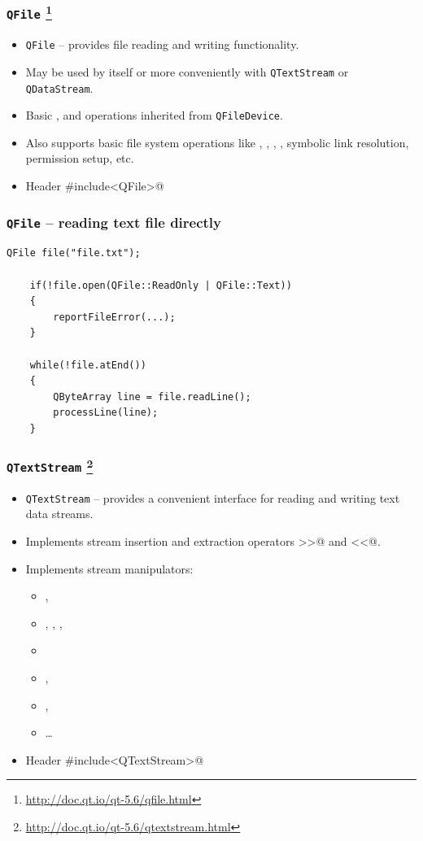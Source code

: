 \begin{frame}[fragile]
  \frametitle{\texttt{QFile}
    \footnote{\url{http://doc.qt.io/qt-5.6/qfile.html}}}
  \begin{itemize}
    \item \texttt{QFile} -- provides file reading and writing functionality.
    \item May be used by itself or more conveniently with \texttt{QTextStream}
      or \texttt{QDataStream}.
    \item Basic \verb@seek@, \verb@read@ and \verb@write@ operations inherited
      from \texttt{QFileDevice}.
    \item Also supports basic file system operations like \verb@rename@,
      \verb@remove@, \verb@link@, \verb@exists@, symbolic link resolution,
      permission setup, etc.
  
    \item Header \verb@#include<QFile>@
  \end{itemize}
\end{frame}

\begin{frame}[fragile]
  \frametitle{\texttt{QFile} -- reading text file directly}

  \begin{lstlisting}[basicstyle=\small\ttfamily]
	QFile file("file.txt");

	if(!file.open(QFile::ReadOnly | QFile::Text))
	{
	    reportFileError(...);
	}

	while(!file.atEnd())
	{
	    QByteArray line = file.readLine();
	    processLine(line);
	}
  \end{lstlisting}
\end{frame}

\begin{frame}[fragile]
  \frametitle{\texttt{QTextStream}
    \footnote{\url{http://doc.qt.io/qt-5.6/qtextstream.html}}}
  \begin{itemize}
    \item \texttt{QTextStream} -- provides a convenient interface for reading
    and writing text data streams.
    \item Implements stream insertion and extraction operators \verb@>>@ and \verb@<<@.
    \item Implements stream manipulators:
    \begin{itemize}
      \item \verb@endl@, \verb@flush@
      \item \verb@dec@, \verb@bin@, \verb@hex@, \verb@oct@
      \item \verb@scientific@
      \item \verb@left@, \verb@right@
      \item \verb@qSetFieldWidth@, \verb@qSetPadChar@
      \item \ldots
    \end{itemize}
    \item Header \verb@#include<QTextStream>@
  \end{itemize}
\end{frame}

